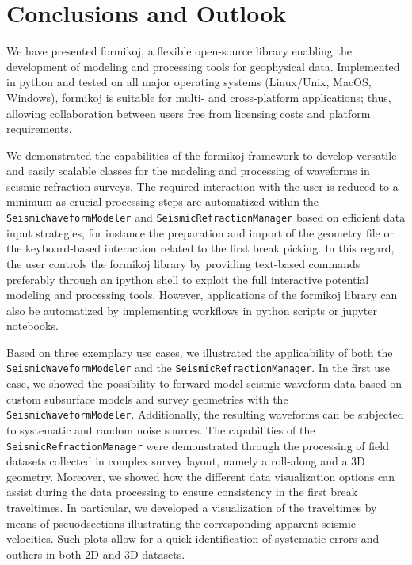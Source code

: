 \documentclass[a4paper,fleqn]{cas-sc}
\begin{document}

\section{Conclusions and Outlook}

We have presented formikoj, a flexible open-source library enabling the development of modeling and processing tools for geophysical data. Implemented in python and tested on all major operating systems (Linux/Unix, MacOS, Windows), formikoj is suitable for multi- and cross-platform applications; thus, allowing collaboration between users free from licensing costs and platform requirements.

We demonstrated the capabilities of the formikoj framework to develop versatile and easily scalable classes for the modeling and processing of waveforms in seismic refraction surveys. The required interaction with the user is reduced to a minimum as crucial processing steps are automatized within the \texttt{SeismicWaveformModeler} and \texttt{SeismicRefractionManager} based on efficient data input strategies, for instance the preparation and import of the geometry file or the keyboard-based interaction related to the first break picking. In this regard, the user controls the formikoj library by providing text-based commands preferably through an ipython shell to exploit the full interactive potential modeling and processing tools. However, applications of the formikoj library can also be automatized by implementing workflows in python scripts or jupyter notebooks.

Based on three exemplary use cases, we illustrated the applicability of both the \texttt{SeismicWaveformModeler} and the \texttt{SeismicRefractionManager}. In the first use case, we showed the possibility to forward model seismic waveform data based on custom subsurface models and survey geometries with the \texttt{SeismicWaveformModeler}. Additionally, the resulting waveforms can be subjected to systematic and random noise sources. 
The capabilities of the \texttt{SeismicRefractionManager} were demonstrated through the processing of field datasets collected in complex survey layout, namely a roll-along and a 3D geometry. 
Moreover, we showed how the different data visualization options can assist during the data processing to ensure consistency in the first break traveltimes. In particular, we developed a visualization of the traveltimes by means of pseuodsections illustrating the corresponding apparent seismic velocities. Such plots allow for a quick identification of systematic errors and outliers in both 2D and 3D datasets.
\end{document}
